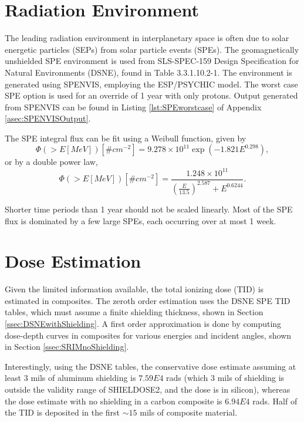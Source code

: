 \documentclass{hitec}
\begin{document}
\section{Radiation Environment}

The leading radiation environment in interplanetary space is often due to solar energetic particles (SEPs) from solar particle events (SPEs). The geomagnetically unshielded SPE environment is used from SLS-SPEC-159 Design Specification for Natural Environments (DSNE), found in Table 3.3.1.10.2-1. The environment is generated using SPENVIS, employing the ESP/PSYCHIC model. The worst case SPE option is used for an override of 1 year with only protons. Output generated from SPENVIS can be found in Listing \ref{lst:SPEworstcase} of Appendix \ref{asec:SPENVISOutput}.

The SPE integral flux can be fit using a Weibull function, given by
\begin{equation}
\Phi(>E[MeV]) [\# cm^{-2}] = 9.278\times 10^{11} \exp\left(-1.821E^{0.298}\right),
\end{equation}
or by a double power law,
\begin{equation}
\Phi(>E[MeV]) [\# cm^{-2}] = \frac{1.248\times 10^{11}}{\left(\frac{E}{13.5}\right)^{2.587} + E^{0.6244}}.
\end{equation}

Shorter time periods than 1 year should not be scaled linearly. Most of the SPE flux is dominated by a few large SPEs, each occurring over at most 1 week.

\section{Dose Estimation}

Given the limited information available, the total ionizing dose (TID) is estimated in composites. The zeroth order estimation uses the DSNE SPE TID tables, which must assume a finite shielding thickness, shown in Section \ref{ssec:DSNEwithShielding}. A first order approximation is done by computing dose-depth curves in composites for various energies and incident angles, shown in Section \ref{ssec:SRIMnoShielding}.

Interestingly, using the DSNE tables, the conservative dose estimate assuming at least 3 mils of aluminum shielding is $7.59E4$ rads (which 3 mils of shielding is outside the validity range of SHIELDOSE2, and the dose is in silicon), whereas the dose estimate with no shielding in a carbon composite is $6.94E4$ rads. Half of the TID is deposited in the first $\sim15$ mils of composite material.
\end{document}
